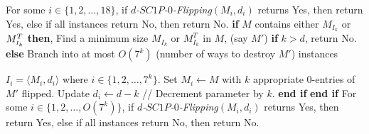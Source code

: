 \documentclass[review, 1p]{elsarticle}
\begin{document}
\begin{algorithm}[h]
\begin{algorithmic}[1]
\noindent For some $i \in \{1,2,\ldots,18\}$, if \textit{$d$-$SC1P$-$0$-Flipping}$(M_{i},d_{i})$ returns Yes, then \vspace{-0.05 in} \newline \vspace{-0.08 in} return Yes, else if all instances return No, then return No.  
\vspace{0.05 in}
\State  \textbf{if} {$M$ contains either $M_{I_{k}}$ or $M^{T}_{\mathsmaller{I_{k}}}$} \textbf{then},\vspace{-0.08 in}
\State  \indent  Find a minimum size $M_{I_{k}}$ or $M_{I_{k}}^{T}$ in $M$, (say $M'$) \vspace{-0.08 in}
\State  \indent \textbf{if} {$k > d$}, return No.\vspace{-0.08 in}
\State  \indent \textbf{else}\vspace{-0.08 in}
 \State  \indent \indent Branch into at most $O(7^{k})$ (number of ways to destroy $M'$) instances 
 
 \vspace{-0.08 in}  \indent \indent \indent \indent \indent \indent \indent \indent $I_{i}=\langle {M_{i}}, d_{i}\rangle$ where $i \in \{1,2,\ldots, 7^{k}\}$. \vspace{-0.05 in}\vspace{-0.05 in}
\State  \indent \indent Set $M_{i} \leftarrow M$ with $k$ appropriate $0$-entries of $M'$ flipped.  \vspace{-0.05 in}
 \State  \indent \indent Update $d_{i} \leftarrow d-k$  \hspace{1.0 in}// Decrement parameter by $k$.\vspace{-0.08 in}
\State  \indent \textbf{end if} \vspace{-0.08 in}
\State  \textbf{end if} \vspace{-0.08 in}
\newline \vspace{-0.08 in}
\hspace{-0.15 in} For some $i \in \{1,2,\ldots,O(7^{k})\}$, if \textit{$d$-$SC1P$-$0$-Flipping}$(M_{i},d_{i})$ returns  Yes, then return Yes, else if all instances return No, then return No.
\end{algorithmic}
\end{algorithm}
\end{document}
